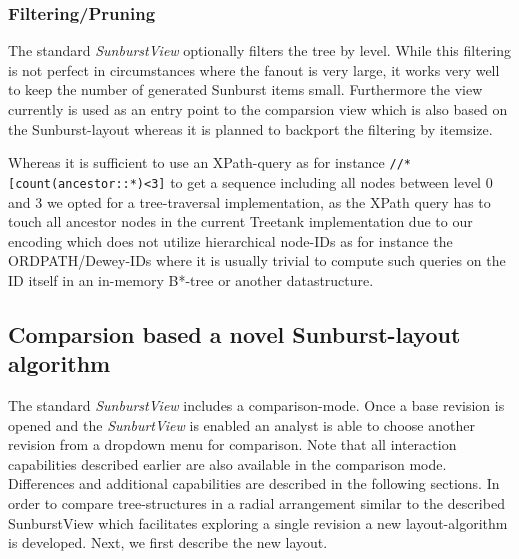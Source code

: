 \begin{itemize}
\subsubsection{Filtering/Pruning}
The standard \emph{SunburstView} optionally filters the tree by level. While this filtering is not perfect in circumstances where the fanout is very large, it works very well to keep the number of generated Sunburst items small. Furthermore the view currently is used as an entry point to the comparsion view which is also based on the Sunburst-layout whereas it is planned to backport the filtering by itemsize.

Whereas it is sufficient to use an XPath-query as for instance \texttt{//*[count(ancestor::*)<3]} to get a sequence including all nodes between level 0 and 3 we opted for a tree-traversal implementation, as the XPath query has to touch all ancestor nodes in the current Treetank implementation due to our encoding which does not utilize hierarchical node-IDs as for instance the ORDPATH/Dewey-IDs where it is usually trivial to compute such queries on the ID itself in an in-memory B*-tree or another datastructure.
\end{itemize}

\subsection{Comparsion based a novel Sunburst-layout algorithm}\label{subsec::comparison}
The standard \emph{SunburstView} includes a comparison-mode. Once a base revision is opened and the \emph{SunburtView} is enabled an analyst is able to choose another revision from a dropdown menu for comparison. Note that all interaction capabilities described earlier are also available in the comparison mode. Differences and additional capabilities are described in the following sections. In order to compare tree-structures in a radial arrangement similar to the described SunburstView which facilitates exploring a single revision a new layout-algorithm is developed. Next, we first describe the new layout.

